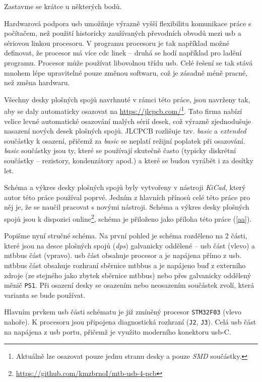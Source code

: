 Zastavme se krátce u některých bodů.

Hardwarová podpora \gls{usb} umožňuje výrazně vyšší flexibilitu komunikace
práce s počítačem, než použití historicky zaužívaných převodních obvodů mezi
\gls{usb} a sériovou linkou procesoru. V programu procesoru je tak například
možné definovat, že procesor má více \gls{cdc} linek – druhá se hodí například
pro ladění programu. Procesor může používat libovolnou třídu \gls{usb}. Celé
řešení se tak stává mnohem lépe upravitelné pouze změnou softwaru, což je
zásadně méně pracné, než změna hardwaru.

Všechny desky plošných spojů navrhnuté v rámci této práce, jsou navrženy tak,
aby se daly automaticky osazovat na \url{https://jlcpcb.com/}\footnote{Aktuálně
lze osazovat pouze jednu stranu desky a pouze \textit{SMD} součástky.}. Tato
firma nabízí velice levné automatické osazování malých sérií desek, což výrazně
zjednodušuje nasazení nových desek plošných spojů. JLCPCB rozlišuje tzv.
\textit{basic} a \textit{extended} součástky k osazení, přičemž za
\textit{basic} se neplatí režijní poplatek při osazování. \textit{basic}
součástky jsou ty, které se používají skutečně často (typicky diskrétní
součástky – rezistory, kondenzátory apod.) a které se budou vyrábět i za
desítky let.

Schéma a výkres desky plošných spojů byly vytvořeny v nástroji \textit{KiCad},
který autor této práce používal poprvé. Jedním z hlavních přínosů celé této
práce pro něj je, že se naučil pracovat s novými nástroji. Schéma a výkres
desky plošných spojů jsou k dispozici
online\footnote{\url{https://github.com/kmzbrnoI/mtb-usb-4-pcb}}, schéma je
přiloženo jako příloha této práce (\ref{aa}).

Popišme nyní stručné schéma. Na první pohled je schéma rozděleno na 2 části,
které jsou na desce plošných spojů (\textit{\gls{dps}}) galvanicky oddělené –
\gls{usb} část (vlevo) a \gls{mtbbus} část (vpravo). \gls{usb} část obsahuje
procesor a je napájena přímo z \gls{usb}. \gls{mtbbus} část obsahuje rozhraní
sběrnice \gls{mtbbus} a je napájeno buď z externího zdroje (ze stejného jako
zbytek sběrnice \gls{mtbbus}) nebo přes galvanicky oddělený měnič \texttt{PS1}.
Při osazení desky se osazením nebo neosazením součástek zvolí, která varianta
se bude používat.

Hlavním prvkem \gls{usb} části schématu je již zmíněný procesor
\texttt{STM32F03} (vlevo nahoře). K procesoru jsou připojena diagnostická
rozhraní (\texttt{J2}, \texttt{J3}). Celá \gls{usb} část na napájena z \gls{usb}
portu, přičemž je využito moderního konektoru \gls{usb}-C.

